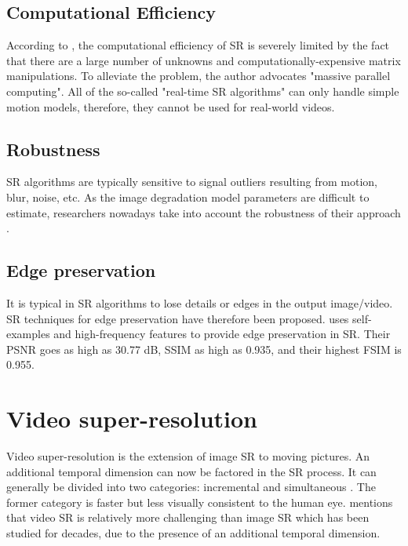 \subsection{Computational Efficiency}
According to \cite{Yang2010a}, the computational efficiency of SR is severely limited by the fact that there are a large number of unknowns and computationally-expensive matrix manipulations. 
To alleviate the problem, the author advocates "massive parallel computing".
All of the so-called "real-time SR algorithms" can only handle simple motion models, therefore, they cannot be used for real-world videos.

\subsection{Robustness}
SR algorithms are typically sensitive to signal outliers resulting from motion, blur, noise, etc. 
As the image degradation model parameters are difficult to estimate, researchers nowadays take into account the robustness of their approach \citep{Yang2010a}.

\subsection{Edge preservation}
It is typical in SR algorithms to lose details or edges in the output image/video. 
SR techniques for edge preservation have therefore been proposed. 
\cite{Vishnukumar2014} uses self-examples and high-frequency features to provide edge preservation in SR. Their PSNR goes as high as 30.77 dB, SSIM as high as 0.935, and their highest FSIM is 0.955.

\section{Video super-resolution}

Video super-resolution is the extension of image SR to moving pictures.
An additional temporal dimension can now be factored in the SR process.
It can generally be divided into two categories: incremental and simultaneous \citep{Su2011}.
The former category is faster but less visually consistent to the human eye.
\cite{Liu2014} mentions that video SR is relatively more challenging than image SR which has been studied for decades, due to the presence of an additional temporal dimension.


